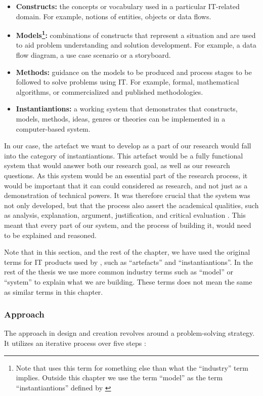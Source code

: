 \begin{itemize}
    \item\textbf{Constructs:} the concepts or vocabulary used in a particular IT-related domain. For example, notions of entities, objects or data flows.
    \item\textbf{Models\footnote{Note that \cite{oates2005researching} uses this term for something else than what the ``industry'' term implies. Outside this chapter we use the term ``model'' as the term ``instantiantions'' defined by \cite{oates2005researching}}:} combinations of constructs that represent a situation and are used to aid problem understanding and solution development. For example, a data flow diagram, a use case scenario or a storyboard.
    \item\textbf{Methods:} guidance on the models to be produced and process stages to be followed to solve problems using IT. For example, formal, mathematical algorithms, or commercialized and published methodologies.
    \item\textbf{Instantiantions:} a working system that demonstrates that constructs, models, methods, ideas, genres or theories can be implemented in a computer-based system.
\end{itemize}

In our case, the artefact we want to develop as a part of our research would fall into the category of instantiantions. This artefact would be a fully functional system that would answer both our research goal, as well as our research questions.  As this system would be an essential part of the research process, it would be important that it can could considered as research, and not just as a demonstration of technical powers. It was therefore crucial that the system was not only developed, but that the process also assert the academical qualities, such as analysis, explanation, argument, justification, and critical evaluation \citep{oates2005researching}. This meant that every part of our system, and the process of building it, would need to be explained and reasoned.

Note that in this section, and the rest of the chapter, we have used the original terms for IT products used by \cite{oates2005researching}, such as ``artefacts'' and ``instantiantions''. In the rest of the thesis we use more common industry terms such as ``model'' or ``system'' to explain what we are building. These terms does not mean the same as similar terms in this chapter.

\subsubsection{Approach}
\label{methodology-design-and-creation-approach}
The approach in design and creation revolves around a problem-solving strategy. It utilizes an iterative process over five steps \citep{vaishnavi2004design, oates2005researching}:

